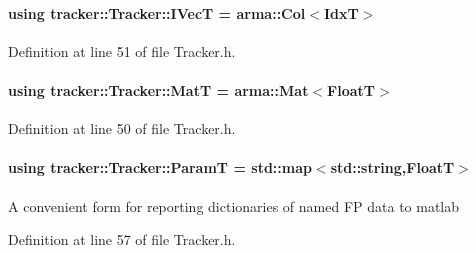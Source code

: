 \paragraph[{\texorpdfstring{I\+VecT}{IVecT}}]{\setlength{\rightskip}{0pt plus 5cm}using {\bf tracker\+::\+Tracker\+::\+I\+VecT} =  arma\+::\+Col$<${\bf IdxT}$>$\hspace{0.3cm}{\ttfamily [inherited]}}\hypertarget{classtracker_1_1Tracker_a59a6e01be987f9c0093a8ac5ad97ce33}{}\label{classtracker_1_1Tracker_a59a6e01be987f9c0093a8ac5ad97ce33}


Definition at line 51 of file Tracker.\+h.

\paragraph[{\texorpdfstring{MatT}{MatT}}]{\setlength{\rightskip}{0pt plus 5cm}using {\bf tracker\+::\+Tracker\+::\+MatT} =  arma\+::\+Mat$<${\bf FloatT}$>$\hspace{0.3cm}{\ttfamily [inherited]}}\hypertarget{classtracker_1_1Tracker_a60a1d6ee07284ba82f0533c79311ccfd}{}\label{classtracker_1_1Tracker_a60a1d6ee07284ba82f0533c79311ccfd}


Definition at line 50 of file Tracker.\+h.

\paragraph[{\texorpdfstring{ParamT}{ParamT}}]{\setlength{\rightskip}{0pt plus 5cm}using {\bf tracker\+::\+Tracker\+::\+ParamT} =  std\+::map$<$std\+::string,{\bf FloatT}$>$\hspace{0.3cm}{\ttfamily [inherited]}}\hypertarget{classtracker_1_1Tracker_a5fd443ec1139ed82910dd16316100db7}{}\label{classtracker_1_1Tracker_a5fd443ec1139ed82910dd16316100db7}
A convenient form for reporting dictionaries of named FP data to matlab 

Definition at line 57 of file Tracker.\+h.

